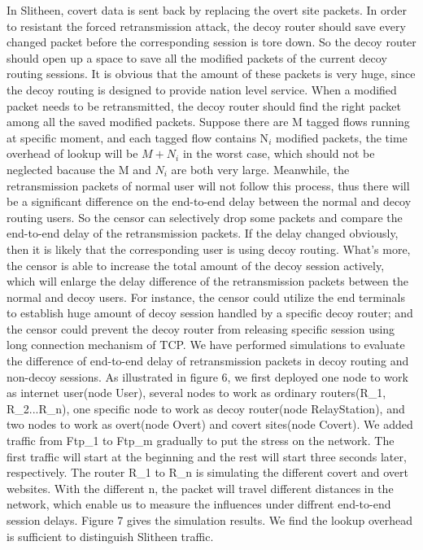 \documentclass[conference]{IEEEtran}
\begin{document}
In Slitheen, covert data is sent back by replacing the overt site packets. In order to resistant the forced retransmission attack, the decoy router should save every changed packet before the corresponding session is tore down. So the decoy router should open up a space to save all the modified packets of the current decoy routing sessions. It is obvious that the amount of these packets is very huge, since the decoy routing is designed to provide nation level service. When a modified packet needs to be retransmitted, the decoy router should find the right packet among all the saved modified packets. Suppose there are M tagged flows running at specific moment, and each tagged flow contains N${_{i}}$ modified packets, the time overhead of lookup will be ${M+N{_{i}}}$ in the worst case, which should not be neglected bacause the M and ${N_{i}}$ are both very large. Meanwhile, the retransmission packets of normal user will not follow this process, thus there will be a significant difference on the end-to-end delay between the normal and decoy routing users. So the censor can selectively drop some packets and compare the end-to-end delay of the retransmission packets. If the delay changed obviously, then it is likely that the corresponding user is using decoy routing. What's more, the censor is able to increase the total amount of the decoy session actively, which will enlarge the delay difference of the retransmission packets between the normal and decoy users. For instance, the censor could utilize the end terminals to establish huge amount of decoy session handled by a specific decoy router; and the censor could prevent the decoy router from releasing specific session using long connection mechanism of TCP. We have performed simulations to evaluate the difference of end-to-end delay of retransmission packets in decoy routing and non-decoy sessions. As illustrated in figure 6, we first deployed one node to work as internet user(node User), several nodes to work as ordinary routers(R\_1, R\_2...R\_n), one specific node to work as decoy router(node RelayStation), and two nodes to work as overt(node Overt) and covert sites(node Covert). We added traffic from Ftp\_1 to Ftp\_m gradually to put the stress on the network. The first  traffic will start at the beginning and the rest will start three seconds later, respectively. The router R\_1 to R\_n is simulating the different covert and overt websites. With the different n, the packet will travel different distances in the network, which enable us to measure the influences under diffrent end-to-end session delays. Figure 7 gives the simulation results. We find the lookup overhead is sufficient to distinguish Slitheen traffic.
\end{document}
